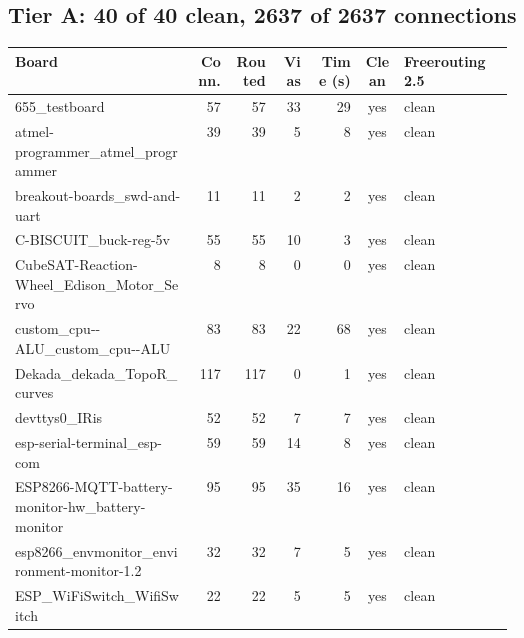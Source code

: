 \subsection*{Tier A: 40 of 40 clean, 2637 of 2637 connections}
\begin{longtable}{@{}p{0.36\linewidth}rrrrcp{0.22\linewidth}@{}}
\toprule Board & Conn. & Routed & Vias & Time (s) & Clean & Freerouting 2.5 \\ \midrule \endhead
655\_\allowbreak{}testboard & 57 & 57 & 33 & 29 & \textcolor{fraqua}{yes} & {\footnotesize clean} \\
atmel-\allowbreak{}programmer\_\allowbreak{}atmel\_\allowbreak{}programmer & 39 & 39 & 5 & 8 & \textcolor{fraqua}{yes} & {\footnotesize clean} \\
breakout-\allowbreak{}boards\_\allowbreak{}swd-\allowbreak{}and-\allowbreak{}uart & 11 & 11 & 2 & 2 & \textcolor{fraqua}{yes} & {\footnotesize clean} \\
C-\allowbreak{}BISCUIT\_\allowbreak{}buck-\allowbreak{}reg-\allowbreak{}5v & 55 & 55 & 10 & 3 & \textcolor{fraqua}{yes} & {\footnotesize clean} \\
CubeSAT-\allowbreak{}Reaction-\allowbreak{}Wheel\_\allowbreak{}Edison\_\allowbreak{}Motor\_\allowbreak{}Servo & 8 & 8 & 0 & 0 & \textcolor{fraqua}{yes} & {\footnotesize clean} \\
custom\_\allowbreak{}cpu-\allowbreak{}-\allowbreak{}ALU\_\allowbreak{}custom\_\allowbreak{}cpu-\allowbreak{}-\allowbreak{}ALU & 83 & 83 & 22 & 68 & \textcolor{fraqua}{yes} & {\footnotesize clean} \\
Dekada\_\allowbreak{}dekada\_\allowbreak{}TopoR\_\allowbreak{}curves & 117 & 117 & 0 & 1 & \textcolor{fraqua}{yes} & {\footnotesize clean} \\
devttys0\_\allowbreak{}IRis & 52 & 52 & 7 & 7 & \textcolor{fraqua}{yes} & {\footnotesize clean} \\
esp-\allowbreak{}serial-\allowbreak{}terminal\_\allowbreak{}esp-\allowbreak{}com & 59 & 59 & 14 & 8 & \textcolor{fraqua}{yes} & {\footnotesize clean} \\
ESP8266-\allowbreak{}MQTT-\allowbreak{}battery-\allowbreak{}monitor-\allowbreak{}hw\_\allowbreak{}battery-\allowbreak{}monitor & 95 & 95 & 35 & 16 & \textcolor{fraqua}{yes} & {\footnotesize clean} \\
esp8266\_\allowbreak{}envmonitor\_\allowbreak{}environment-\allowbreak{}monitor-\allowbreak{}1.2 & 32 & 32 & 7 & 5 & \textcolor{fraqua}{yes} & {\footnotesize clean} \\
ESP\_\allowbreak{}WiFiSwitch\_\allowbreak{}WifiSwitch & 22 & 22 & 5 & 5 & \textcolor{fraqua}{yes} & {\footnotesize clean} \\

\end{longtable}

